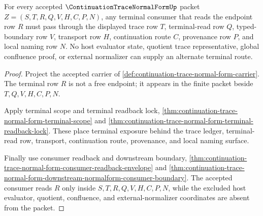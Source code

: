\begin{theorem}
\label{thm:continuation-trace-normal-form-terminal-consumer-cut}
For every accepted $\ContinuationTraceNormalFormUp$ packet $Z=(S,T,R,Q,V,H,C,P,N)$, any terminal consumer that reads the endpoint row $R$ must pass through the displayed trace row $T$, terminal-read row $Q$, typed-boundary row $V$, transport row $H$, continuation route $C$, provenance row $P$, and local naming row $N$. No host evaluator state, quotient trace representative, global confluence proof, or external normalizer can supply an alternate terminal route.
\end{theorem}
\begin{proof}
Project the accepted carrier of \autoref{def:continuation-trace-normal-form-carrier}. The terminal row $R$ is not a free endpoint; it appears in the finite packet beside $T,Q,V,H,C,P,N$.

Apply terminal scope and terminal readback lock, \autoref{thm:continuation-trace-normal-form-terminal-scope} and \autoref{thm:continuation-trace-normal-form-terminal-readback-lock}. These place terminal exposure behind the trace ledger, terminal-read row, transport, continuation route, provenance, and local naming surface.

Finally use consumer readback and downstream boundary, \autoref{thm:continuation-trace-normal-form-consumer-readback-envelope} and \autoref{thm:continuation-trace-normal-form-downstream-normalform-consumer-boundary}. The accepted consumer reads $R$ only inside $S,T,R,Q,V,H,C,P,N$, while the excluded host evaluator, quotient, confluence, and external-normalizer coordinates are absent from the packet.
\end{proof}

